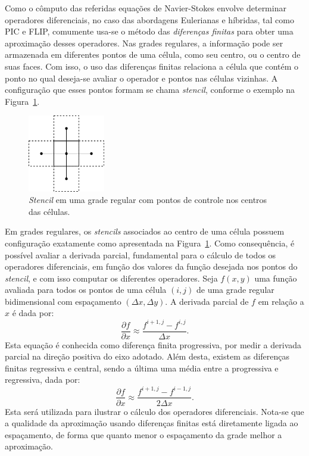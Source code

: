 \documentclass[12pt,a4paper,dvipsnames]{article}
\newcommand{\figref}[1]{Figura~\ref{#1}}
\begin{document}
Como o cômputo das referidas equações de Navier-Stokes envolve determinar operadores diferenciais, no caso das abordagens Eulerianas e híbridas, tal como PIC e FLIP, comumente usa-se o método das \textit{diferenças finitas} \cite{levequeFDM} para obter uma aproximação desses operadores. Nas grades regulares, a informação pode ser armazenada em diferentes pontos de uma célula, como seu centro, ou o centro de suas faces. Com isso, o uso das diferenças finitas relaciona a célula que contém o ponto no qual deseja-se avaliar o operador e pontos nas células vizinhas. A configuração que esses pontos formam se chama \textit{stencil}, conforme o exemplo na \figref{fig:stencil}.

\begin{figure}[ht]
    \centering
    \includegraphics[width=0.3\textwidth]{Stencil.pdf}
    \caption{\textit{Stencil} em uma grade regular com pontos de controle nos centros das células.}
    \label{fig:stencil}
\end{figure}

Em grades regulares, os \textit{stencils} associados ao centro de uma célula possuem configuração exatamente como apresentada na \figref{fig:stencil}. Como consequência, é possível avaliar a derivada parcial, fundamental para o cálculo de todos os operadores diferenciais, em função dos valores da função desejada nos pontos do \textit{stencil}, e com isso computar os diferentes operadores. Seja $f(x, y)$ uma função avaliada para todos os pontos de uma célula $(i, j)$ de uma grade regular bidimensional com espaçamento $(\Delta x,\Delta y)$. A derivada parcial de $f$ em relação a $x$ é dada por:
\begin{equation}
    \frac{\partial f}{\partial x} \approx \frac{f^{i+1, j} - f^{i,j}}{\Delta x}.
\end{equation}
Esta equação é conhecida como diferença finita progressiva, por medir a derivada parcial na direção positiva do eixo adotado. Além desta, existem as diferenças finitas regressiva e central, sendo a última uma média entre a progressiva e regressiva, dada por:
\begin{equation}
    \frac{\partial f}{\partial x} \approx \frac{f^{i+1, j} - f^{i-1,j}}{2\Delta x}.
\end{equation}
Esta será utilizada para ilustrar o cálculo dos operadores diferenciais. Nota-se que a qualidade da aproximação usando diferenças finitas está diretamente ligada ao espaçamento, de forma que quanto menor o espaçamento da grade melhor a aproximação.
\end{document}
